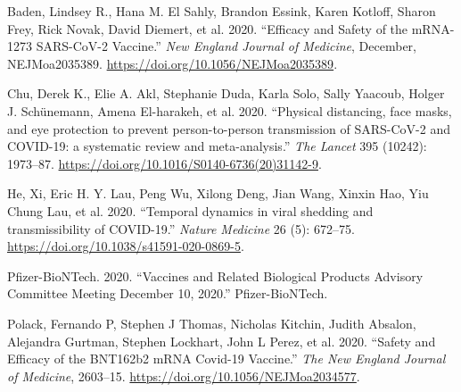 \documentclass[
]{article}
\newlength{\cslhangindent}
\newenvironment{cslreferences}%
  {\setlength{\parindent}{0pt}%
  \everypar{\setlength{\hangindent}{\cslhangindent}}\ignorespaces}%
  {\par}
\begin{document}
\hypertarget{refs}{}
\begin{cslreferences}
\leavevmode\hypertarget{ref-Baden2020}{}%
Baden, Lindsey R., Hana M. El Sahly, Brandon Essink, Karen Kotloff,
Sharon Frey, Rick Novak, David Diemert, et al. 2020. ``Efficacy and
Safety of the mRNA-1273 SARS-CoV-2 Vaccine.'' \emph{New England Journal
of Medicine}, December, NEJMoa2035389.
\url{https://doi.org/10.1056/NEJMoa2035389}.

\leavevmode\hypertarget{ref-Chu2020}{}%
Chu, Derek K., Elie A. Akl, Stephanie Duda, Karla Solo, Sally Yaacoub,
Holger J. Schünemann, Amena El-harakeh, et al. 2020. ``Physical
distancing, face masks, and eye protection to prevent person-to-person
transmission of SARS-CoV-2 and COVID-19: a systematic review and
meta-analysis.'' \emph{The Lancet} 395 (10242): 1973--87.
\url{https://doi.org/10.1016/S0140-6736(20)31142-9}.

\leavevmode\hypertarget{ref-He2020}{}%
He, Xi, Eric H. Y. Lau, Peng Wu, Xilong Deng, Jian Wang, Xinxin Hao, Yiu
Chung Lau, et al. 2020. ``Temporal dynamics in viral shedding and
transmissibility of COVID-19.'' \emph{Nature Medicine} 26 (5): 672--75.
\url{https://doi.org/10.1038/s41591-020-0869-5}.

\leavevmode\hypertarget{ref-Pfizer2020}{}%
Pfizer-BioNTech. 2020. ``Vaccines and Related Biological Products
Advisory Committee Meeting December 10, 2020.'' Pfizer-BioNTech.

\leavevmode\hypertarget{ref-Polack2020}{}%
Polack, Fernando P, Stephen J Thomas, Nicholas Kitchin, Judith Absalon,
Alejandra Gurtman, Stephen Lockhart, John L Perez, et al. 2020. ``Safety
and Efficacy of the BNT162b2 mRNA Covid-19 Vaccine.'' \emph{The New
England Journal of Medicine}, 2603--15.
\url{https://doi.org/10.1056/NEJMoa2034577}.
\end{cslreferences}
\end{document}

